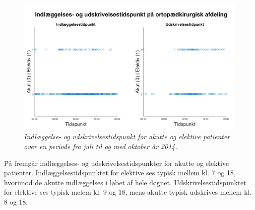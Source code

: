 \begin{figure}[H]
	\centering
	\includegraphics[scale=0.5]{figures/indlaegudskriv.png}
	\caption{\textit{Indlæggelse- og udskrivelsestidspunkt for akutte og elektive patienter over en periode fra juli til og med oktober år 2014.}}
	\label{indlaegudskriv}
	\end{figure}
	
\noindent
På  fremgår indlæggelses- og udskrivelsestidspunkter for akutte og elektive patienter. Indlæggelsestidspunktet for elektive ses typisk mellem kl. 7 og 18, hvorimod de akutte indlæggelses i løbet af hele døgnet. Udskrivelsestidspunktet for elektive ses typisk melem kl. 9 og 18, mens akutte typisk udskrives mellem kl. 8 og 18. 

